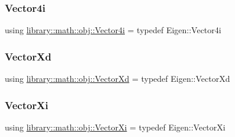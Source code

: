 \mbox{\label{namespacelibrary_1_1math_1_1obj_a5181dbb9520bc27fe956555569ef1271}} 
\subsubsection{\texorpdfstring{Vector4i}{Vector4i}}
{\footnotesize\ttfamily using \hyperlink{namespacelibrary_1_1math_1_1obj_a5181dbb9520bc27fe956555569ef1271}{library\+::math\+::obj\+::\+Vector4i} = typedef Eigen\+::\+Vector4i}

\mbox{\label{namespacelibrary_1_1math_1_1obj_a54fa1a789b235483252f0525f0abf579}} 
\subsubsection{\texorpdfstring{Vector\+Xd}{VectorXd}}
{\footnotesize\ttfamily using \hyperlink{namespacelibrary_1_1math_1_1obj_a54fa1a789b235483252f0525f0abf579}{library\+::math\+::obj\+::\+Vector\+Xd} = typedef Eigen\+::\+Vector\+Xd}

\mbox{\label{namespacelibrary_1_1math_1_1obj_a2cd4b891130c163c72ea6a546132cb2d}} 
\subsubsection{\texorpdfstring{Vector\+Xi}{VectorXi}}
{\footnotesize\ttfamily using \hyperlink{namespacelibrary_1_1math_1_1obj_a2cd4b891130c163c72ea6a546132cb2d}{library\+::math\+::obj\+::\+Vector\+Xi} = typedef Eigen\+::\+Vector\+Xi}

